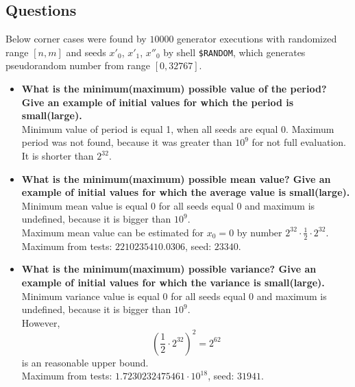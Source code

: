 \documentclass[a4paper,10pt]{article}
\begin{document}
\subsection{Questions}
Below corner cases were found by $10000$ generator executions with randomized range $[n,m]$ and seeds ${x'_0}$, ${x'_1}$, ${x''_0}$ by shell \texttt{\$RANDOM}, which generates pseudorandom number from range $[0,32767]$.
\begin{itemize}
 \item \textbf{What is the minimum(maximum) possible value of the period? Give an example of initial values for which the period is small(large).} \\ 
Minimum value of period is equal 1, when all seeds are equal 0. Maximum period was not found, because it was greater than $10^9$ for not full evaluation. It is shorter than $2^32$.
 \item \textbf{What is the minimum(maximum) possible mean value? Give an example of initial values for which the average value is small(large).} \\
Minimum mean value is equal 0 for all seeds equal 0 and maximum is undefined, because it is bigger than $10^9$. \\
Maximum mean value can be estimated for $x_0 = 0$ by number $2^{32} \cdot \frac{1}{2} \cdot 2^{32} $. \\
Maximum from tests: $2210235410.0306$, seed: $23340$.
 \item \textbf{What is the minimum(maximum) possible variance? Give an example of initial values for which the variance is small(large).} \\
Minimum variance value is equal 0 for all seeds equal 0 and maximum is undefined, because it is bigger than $10^9$. \\
However, $$(\frac{1}{2} \cdot 2^{32})^2 = 2^{62}$$ is an reasonable upper bound. \\
Maximum from tests: $1.7230232475461\cdot 10^{18}$, seed: $31941$.


\end{itemize}
\end{document}
